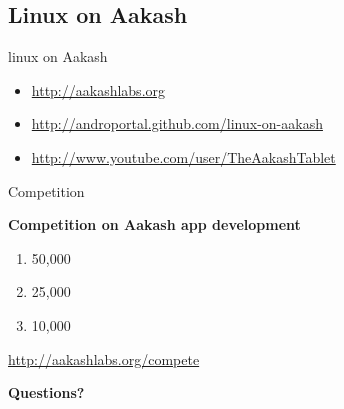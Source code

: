 \documentclass{beamer}
\begin{document}
\subsection{Linux on Aakash}
\begin{frame}{linux on Aakash}
  \begin{block}{}
    \begin{itemize}
    \item \url{http://aakashlabs.org}
    \item \url{http://androportal.github.com/linux-on-aakash}
    \item \url{http://www.youtube.com/user/TheAakashTablet}
    \end{itemize}
  \end{block}
\end{frame}

\begin{frame}{Competition}
  \begin{block}{\bf Competition on Aakash app development}
    \begin{enumerate}
      \item 50,000
      \item 25,000
      \item 10,000  
    \end{enumerate}
  \end{block}
  \centerline {\url{http://aakashlabs.org/compete}}
\end{frame}
\begin{frame}{}
  \centerline{\bf Questions?}
\end{frame}
\end{document}
